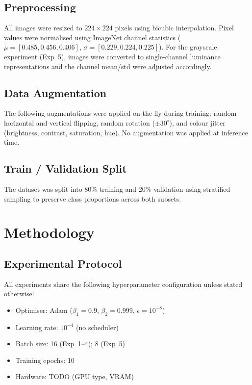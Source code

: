 \documentclass[12pt, a4paper]{article}
\begin{document}
\subsection{Preprocessing}
\label{ssec:preprocessing}

All images were resized to $224 \times 224$ pixels using bicubic interpolation.
Pixel values were normalised using ImageNet channel statistics
($\mu = [0.485, 0.456, 0.406]$, $\sigma = [0.229, 0.224, 0.225]$).
For the grayscale experiment (Exp~5), images were converted to single-channel
luminance representations and the channel mean/std were adjusted accordingly.

\subsection{Data Augmentation}
\label{ssec:augmentation}

The following augmentations were applied on-the-fly during training:
random horizontal and vertical flipping, random rotation ($\pm 30^\circ$),
and colour jitter (brightness, contrast, saturation, hue).
No augmentation was applied at inference time.

\subsection{Train / Validation Split}
\label{ssec:split}

The dataset was split into 80\% training and 20\% validation using stratified
sampling to preserve class proportions across both subsets.

\section{Methodology}
\label{sec:methodology}

\subsection{Experimental Protocol}
\label{ssec:protocol}

All experiments share the following hyperparameter configuration unless stated
otherwise:
\begin{itemize}
    \item Optimiser: Adam ($\beta_1=0.9$, $\beta_2=0.999$, $\epsilon=10^{-8}$)
    \item Learning rate: $10^{-4}$ (no scheduler)
    \item Batch size: 16 (Exp~1--4); 8 (Exp~5)
    \item Training epochs: 10
    \item Hardware: TODO (GPU type, VRAM)
\end{itemize}
\end{document}
